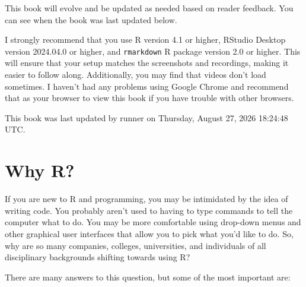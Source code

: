 \documentclass[]{tufte-book}
\begin{document}
This book will evolve and be updated as needed based on reader feedback. You can see when the book was last updated below.

I strongly recommend that you use R version 4.1 or higher, RStudio Desktop version 2024.04.0 or higher, and \texttt{rmarkdown} R package version 2.0 or higher. This will ensure that your setup matches the screenshots and recordings, making it easier to follow along. Additionally, you may find that videos don't load sometimes. I haven't had any problems using Google Chrome and recommend that as your browser to view this book if you have trouble with other browsers.

This book was last updated by runner on Thursday, August 27, 2026 18:24:48 UTC.

\chapter{Why R?}\label{whyR}

If you are new to R and programming, you may be intimidated by the idea of writing code. You probably aren't used to having to type commands to tell the computer what to do. You may be more comfortable using drop-down menus and other graphical user interfaces that allow you to pick what you'd like to do. So, why are so many companies, colleges, universities, and individuals of all disciplinary backgrounds shifting towards using R?

There are many answers to this question, but some of the most important are:
\end{document}
